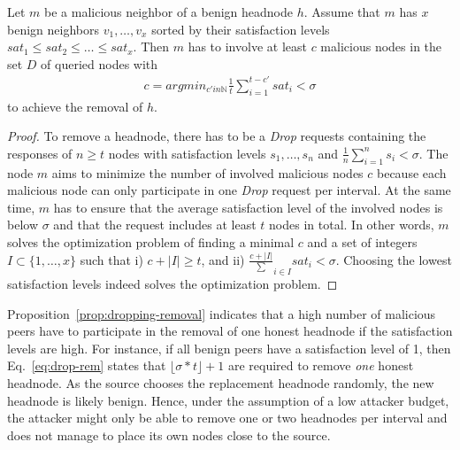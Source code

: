 \begin{proposition}
\label{prop:dropping-removal}
Let $m$ be a malicious neighbor of a benign headnode $h$. Assume that $m$ has $x$ benign neighbors $v_1, \ldots , v_x$ sorted by their satisfaction levels $sat_1 \leq sat_2 \leq \ldots  \leq sat_x$. 
Then $m$ has to involve at least $c$ malicious nodes in the set $D$ of queried nodes with 
\begin{align}
\label{eq:drop-rem}
c = argmin_{c' in \mathbb{N}} \frac{1}{t}\sum_{i=1}^{t-c'}sat_i < \sigma
\end{align}
to achieve the removal of $h$. 
\end{proposition}
\begin{proof}
To remove a headnode, there has to be a \textit{Drop} requests containing the responses of $n\geq t$ nodes with satisfaction levels $s_1, \ldots , s_n$ and 
$\frac{1}{n}\sum_{i=1}^{n}s_i < \sigma$.
The node $m$ aims to minimize the number of involved malicious nodes $c$ because each malicious node can only participate in one \textit{Drop} request per interval. At the same time, $m$ has to ensure that the average satisfaction level of the involved nodes is below $\sigma$ and that the request includes at least $t$ nodes in total.
In other words, $m$ solves the optimization problem of finding a minimal $c$ and a set of integers $I \subset \{1, \ldots, x\}$ such that i) $c + |I| \geq t$, and ii) $\frac{c + |I|} \sum_{i \in I} sat_i < \sigma$. 
Choosing the lowest satisfaction levels indeed solves the optimization problem. 
\end{proof}

Proposition~\ref{prop:dropping-removal} indicates that a high number of malicious peers have to participate in the removal of one honest headnode if the satisfaction levels are high. 
For instance, if all benign peers have a satisfaction level of 1, then Eq.~\ref{eq:drop-rem} states that $\lfloor \sigma*t \rfloor +1$ are required to remove \emph{one} honest headnode. As the source chooses the replacement headnode  randomly, the new headnode is likely benign. Hence, under the assumption of a low attacker budget, the attacker might only be able to remove one or two headnodes per interval and does not manage to place its own nodes close to the source. 

